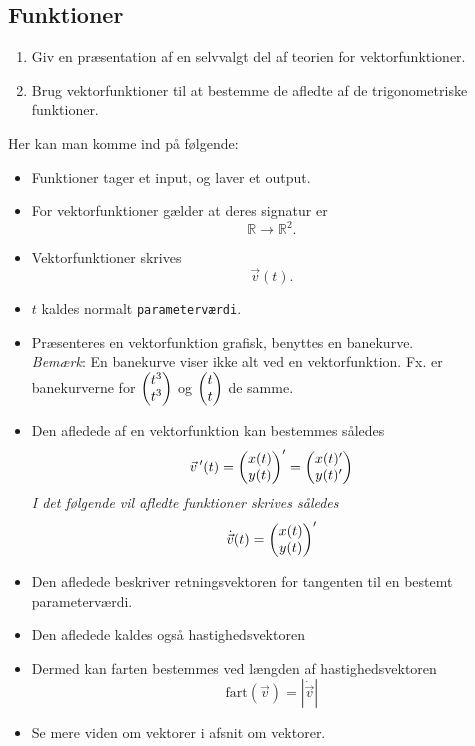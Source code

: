 \documentclass{article}
\begin{document}
\begin{tcolorbox}
	\section{Funktioner}
	\tcblower
	\begin{enumerate}
		\item Giv en præsentation af en selvvalgt del af teorien for vektorfunktioner.
		\item Brug vektorfunktioner til at bestemme de afledte af de trigonometriske funktioner.
	\end{enumerate}
\end{tcolorbox}
Her kan man komme ind på følgende:
\begin{itemize}
	\item Funktioner tager et input, og laver et output.
	\item For vektorfunktioner gælder at deres signatur er
		\[
			\mathbb{R} \rightarrow \mathbb{R}^2.
		\] 
	\item Vektorfunktioner skrives
		\[
			\vec{v}(t).
		\] 
	\item $t$ kaldes normalt \texttt{parameterværdi}.
	\item Præsenteres en vektorfunktion grafisk, benyttes en banekurve.\\
		\textit{Bemærk}: En banekurve viser ikke alt ved en vektorfunktion. Fx.
		er banekurverne for $ \begin{pmatrix} t^3\\ t^3 \end{pmatrix} $ og $ \begin{pmatrix} t\\ t \end{pmatrix} $ de samme.
	\item Den afledede af en vektorfunktion kan bestemmes således
		\[
			\vec{v}\,'(t) =  \begin{pmatrix} x(t)\\ y(t) \end{pmatrix} ' =  \begin{pmatrix} x(t)'\\ y(t)' \end{pmatrix} 
		\] 
		\textit{I det følgende vil afledte funktioner skrives således}
		\[
			\dot{\vec{v}}(t) = { \begin{pmatrix} x(t)\\ y(t) \end{pmatrix} }'
		\] 
	\item Den afledede beskriver retningsvektoren for tangenten til en bestemt
		parameterværdi.

	\item Den afledede kaldes også hastighedsvektoren
	\item Dermed kan farten bestemmes ved længden af hastighedsvektoren
		\[
			\text{fart}(\vec{v}) = \left|\dot{\vec{v}}\right|
		\] 
	\item Se mere viden om vektorer i afsnit om vektorer.
\end{itemize}
\end{document}
